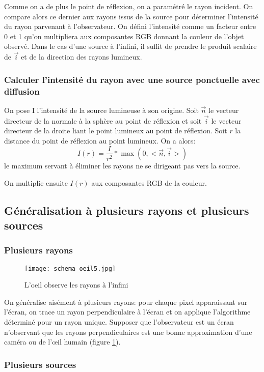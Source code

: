 \documentclass[11pt,a4paper]{article}
\begin{document}
Comme on a de plus le point de réflexion, on a paramétré le rayon incident. On compare alors ce dernier aux rayons issus de la source pour déterminer l'intensité du rayon parvenant à l'observateur. On défini l'intensité comme un facteur entre 0 et 1 qu'on multipliera aux composantes RGB donnant la couleur de l'objet observé. Dans le cas d'une source à l'infini, il suffit de prendre le produit scalaire de $\vec{i}$ et de la direction des rayons lumineux.

\subsubsection{Calculer l'intensité du rayon avec une source ponctuelle avec diffusion}

On pose I l'intensité de la source lumineuse à son origine. Soit $\vec{n}$ le vecteur directeur de la normale à la sphère au point de réflexion et soit $\vec{i}$ le vecteur directeur de la droite liant le point lumineux au point de réflexion. Soit $r$ la distance du point de réflexion au point lumineux. On a alors:
\[I(r) = \frac{I}{r^2}*\max (0,<\vec{n},\vec{i}>)\]
le maximum servant à éliminer les rayons ne se dirigeant pas vers la source.

On multiplie ensuite $I(r)$ aux composantes RGB de la couleur.

\subsection{Généralisation à plusieurs rayons et plusieurs sources}

\subsubsection{Plusieurs rayons}

\begin{figure}
	\centering
	\texttt{[image: schema\_oeil5.jpg]}
	\caption{L'oeil observe les rayons à l'infini}
	\label{oeil}
\end{figure}

On généralise aisément à plusieurs rayons: pour chaque pixel apparaissant sur l'écran, on trace un rayon perpendiculaire à l'écran et on applique l'algorithme déterminé pour un rayon unique. Supposer que l'observateur est un écran n'observant que les rayons perpendiculaires est une bonne approximation d'une caméra ou de l'œil humain (figure \ref{oeil}). 

\subsubsection{Plusieurs sources}
\end{document}
